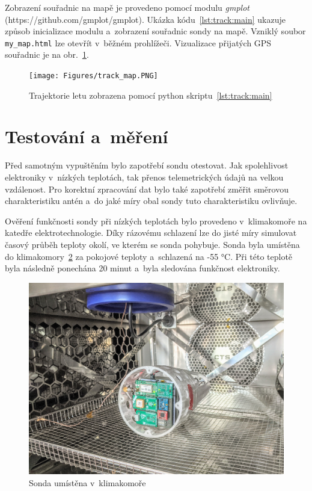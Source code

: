 \documentclass[twoside]{ctuthesis}
\theoremstyle{plain}
\theoremstyle{definition}
\theoremstyle{note}
\begin{document}
	

	Zobrazení souřadnic na mapě je provedeno pomocí modulu \textit{gmplot} (https://github.com/gmplot/gmplot). Ukázka kódu~\ref{lst:track:main} ukazuje způsob inicializace modulu a~zobrazení souřadnic sondy na mapě. Vzniklý soubor \lstinline|my_map.html| lze otevřít v~běžném prohlížeči. Vizualizace přijatých GPS souřadnic je na obr.~\ref{fig:track:map}.

	

	\begin{figure}[hbtp]
		\centering
		\texttt{[image: Figures/track\_map.PNG]}
		\caption{Trajektorie letu zobrazena pomocí python skriptu~\ref{lst:track:main}}
		\label{fig:track:map}
	\end{figure}










	\section{Testování a~měření}
	Před samotným vypuštěním bylo zapotřebí sondu otestovat. Jak spolehlivost elektroniky v~nízkých teplotách, tak přenos telemetrických údajů na velkou vzdálenost. Pro korektní zpracování dat bylo také zapotřebí změřit směrovou charakteristiku antén a~do jaké míry obal sondy tuto charakteristiku ovlivňuje.

	Ověření funkčnosti sondy při nízkých teplotách bylo provedeno v~klimakomoře na katedře elektrotechnologie. Díky rázovému schlazení lze do jisté míry simulovat časový průběh teploty okolí, ve kterém se sonda pohybuje. Sonda byla umístěna do klimakomory~\ref{fig:sonda:klimakomora} za pokojové teploty a~schlazená na -55 °C. Při této teplotě byla následně ponechána 20 minut a~byla sledována funkčnost elektroniky.

	\begin{figure}[hbtp]
		\centering
		\includegraphics[width=.7\textwidth]{Figures/sonda_klimakomora.jpg}
		\caption{Sonda umístěna v~klimakomoře}
		\label{fig:sonda:klimakomora}
	\end{figure}
\end{document}
